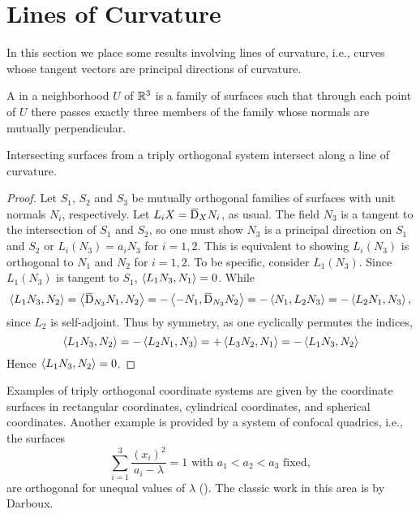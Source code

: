 \documentclass[../main]{subfiles}
\begin{document}
\section{Lines of Curvature}\label{ch03:s5}
In this section we place some results involving lines of curvature, i.e., curves whose tangent vectors are principal directions of curvature. 

\begin{definition}
A  in a neighborhood $U$ of $\mathbb{R}^3$ is a family of surfaces such that through each point of $U$ there passes exactly three members of the family whose normals are mutually perpendicular. 
\end{definition}



\begin{theorem}[Dupin] \label{thm:ch3.5.1}
Intersecting surfaces from a triply orthogonal system intersect along a line of curvature.
\end{theorem}

\begin{proof}
Let $S_1$, $S_2$ and $S_3$ be mutually orthogonal families of surfaces with unit normals $N_i$, respectively. Let $L_i X = \covariant_X N_i$, as usual. The field $N_3$ is a tangent to the intersection of $S_1$ and $S_2$, so one must show $N_3$ is a principal direction on $S_1$ and $S_2$ or $L_i(N_3) = a_i N_3$ for $i = 1, 2$. This is equivalent to showing $L_i(N_3)$ is orthogonal to $N_1$ and $N_2$ for $i = 1, 2$. To be specific, consider $L_1(N_3)$. Since $L_1(N_3)$ is tangent to $S_1$, $\left\langle L_1 N_3,N_1\right\rangle = 0$. While \[\ip {L_1 N_3} {N_2} = \ip {\covariant_{N_3} N_1} {N_2} = -\ip{-N_1} {\covariant_{N_3} N_2} = -\ip {N_1} {L_2 N_3} = -\ip{L_2 N_1} {N_3},\] since $L_2$ is self-adjoint. Thus by symmetry, as one cyclically permutes the indices, 
\[
\left\langle L_1 N_3,N_2\right\rangle = -\left\langle L_2 N_1,N_3\right\rangle = +\left\langle L_3 N_2,N_1\right\rangle = -\left\langle L_1 N_3,N_2\right\rangle
\]
Hence $\left\langle L_1 N_3,N_2\right\rangle = 0$.
\end{proof}



Examples of triply orthogonal coordinate systems are given by the coordinate surfaces in rectangular coordinates, cylindrical coordinates, and spherical coordinates. Another example is provided by a system of confocal quadrics, i.e., the surfaces \[\sum\limits_{i=1}^3 \dfrac{(x_i)^2}{a_i - \lambda} = 1\text{ with }a_1 < a_2 < a_3\text{ fixed},\]are orthogonal for unequal values of $\lambda$ (\cite[p.~100]{struik1961lectures}). The classic work in this area is by Darboux. 
\end{document}

